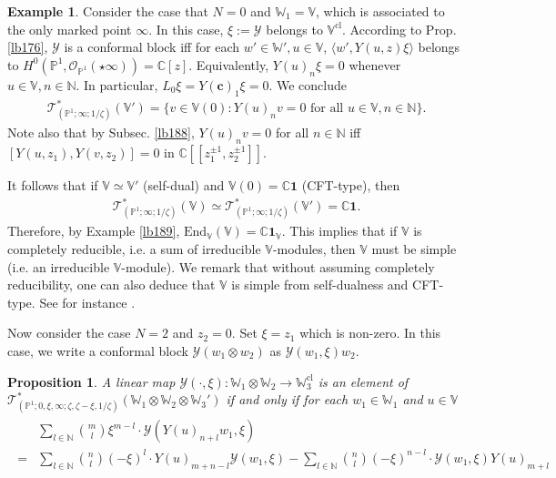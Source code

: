 \documentclass[11pt,b5paper,notitlepage]{article}
\theoremstyle{definition}
\newtheorem{eg}[df]{Example}
\theoremstyle{plain}
\newtheorem{pp}[df]{Proposition}
\newcommand{\mc}{\mathcal}
\newcommand{\End}{\mathrm{End}} %
\newcommand{\id}{\mathbf{1}}
\newcommand{\bk}[1]{\langle {#1}\rangle}
\newcommand{\scr}{\mathscr}
\newcommand{\Vbb}{\mathbb V}
\newcommand{\Wbb}{\mathbb W}
\newcommand{\Cbb}{\mathbb C}
\newcommand{\Nbb}{\mathbb N}
\newcommand{\Pbb}{\mathbb P}
\newcommand{\cbf}{\mathbf c}
\newcommand{\cl}{\mathrm{cl}}
\numberwithin{equation}{section}
\begin{document}
\begin{eg}
Consider the case that $N=0$ and  $\Wbb_1=\Vbb$, which is associated to the only marked point $\infty$. In this case, $\xi:=\mc Y$ belongs to $\Vbb^\cl$. According to Prop. \ref{lb176}, $\mc Y$ is a conformal block iff for each $w'\in\Wbb',u\in\Vbb$, $\bk{w',Y(u,z) \xi}$ belongs to $H^0(\Pbb^1,\scr O_{\Pbb^1}(\star\infty))=\Cbb[z]$. Equivalently, $Y(u)_n\xi=0$ whenever $u\in\Vbb,n\in\Nbb$. In particular,  $L_0\xi=Y(\cbf)_1\xi=0$. We conclude
\begin{align}
\scr T_{(\Pbb^1;\infty;1/\zeta)}^*(\Vbb')=\{v\in\Vbb(0):Y(u)_nv=0\text{ for all }u\in\Vbb,n\in\Nbb\}.
\end{align}
Note also that by Subsec. \ref{lb188}, $Y(u)_nv=0$ for all $n\in\Nbb$ iff $[Y(u,z_1),Y(v,z_2)]=0$ in $\Cbb[[z_1^{\pm1},z_2^{\pm1}]]$. 

It follows that if $\Vbb\simeq\Vbb'$ (self-dual) and $\Vbb(0)=\Cbb\id$ (CFT-type), then
\begin{align}
\scr T_{(\Pbb^1;\infty;1/\zeta)}^*(\Vbb)\simeq\scr T_{(\Pbb^1;\infty;1/\zeta)}^*(\Vbb')=\Cbb\id.
\end{align}
Therefore, by Example \ref{lb189}, $\End_\Vbb(\Vbb)=\Cbb\id_\Vbb$. This implies that if $\Vbb$ is completely reducible, i.e. a sum of irreducible $\Vbb$-modules, then $\Vbb$ must be simple (i.e. an irreducible $\Vbb$-module). We remark that without assuming completely reducibility, one can also deduce that $\Vbb$ is simple from self-dualness and CFT-type. See for instance \cite[Prop. 4.6]{CKLW18}.\hfill\qedsymbol
\end{eg}






Now consider the case $N=2$ and $z_2=0$. Set $\xi=z_1$ which is non-zero. In this case, we write a conformal block $\mc Y(w_1\otimes w_2)$ as $\mc Y(w_1,\xi)w_2$.

\begin{pp}
A linear map $\mc Y(\cdot,\xi):\Wbb_1\otimes\Wbb_2\rightarrow\Wbb_3^\cl$ is an element of $\scr T_{(\Pbb^1;0,\xi,\infty;\zeta,\zeta-\xi,1/\zeta)}^*(\Wbb_1\otimes\Wbb_2\otimes\Wbb_3')$ if and only if for each $w_1\in\Wbb_1$ and $u\in\Vbb$
\begin{align}\label{eq257}
\begin{aligned}
&\sum_{l\in\Nbb}{m\choose l}\xi^{m-l}\cdot \mc Y(Y(u)_{n+l}w_1,\xi)\\
=&\sum_{l\in\Nbb}{n\choose l}(-\xi)^l\cdot Y(u)_{m+n-l}\mc Y(w_1,\xi)-\sum_{l\in\Nbb}{n\choose l}(-\xi)^{n-l}\cdot\mc Y(w_1,\xi)Y(u)_{m+l}
\end{aligned}
\end{align}
\end{pp}
\end{document}
